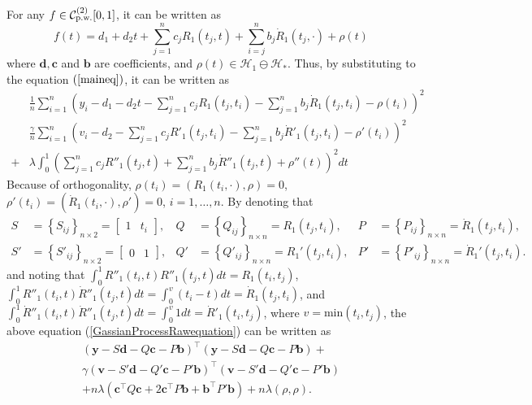 For any $f\in\mathcal{C}_{\mbox{\scriptsize p.w.}}^{(2)}[0,1]$, it can be written as 
\begin{equation}\label{GaussianProcessFunctionF}
f(t)=d_1+d_2t+\sum_{j=1}^{n}c_jR_1(t_j,t)+\sum_{i=j}^{n}b_j\dot{R}_1(t_j,\cdot) +\rho(t)
\end{equation}
where $\mathbf{d},\mathbf{c}$ and $\mathbf{b}$ are coefficients, and $\rho(t) \in \mathcal{H}_1 \ominus \mathcal{H}_*$. Thus, by substituting to the equation $(\ref{maineq})$, it can be written as 
\begin{equation}\label{GassianProcessRawequation}
\begin{split}
&\frac{1}{n}\sum_{i=1}^n \left( y_i - d_1-d_2t-\sum_{j=1}^{n}c_jR_1(t_j,t_i)-\sum_{j=1}^{n}b_j\dot{R}_1(t_j,t_i)-\rho(t_i) \right) ^2\\
&\frac{\gamma}{n}\sum_{i=1}^n \left( v_i - d_2-\sum_{j=1}^{n}c_jR'_1(t_j,t_i)-\sum_{j=1}^{n}b_j\dot{R}'_1(t_j,t_i)-\rho'(t_i) \right) ^2\\
+&\lambda \int_0^1 \left( \sum_{j=1}^{n}c_jR''_1(t_j,t)+\sum_{j=1}^{n}b_j\dot{R}''_1(t_j,t)+\rho''(t)\right)^2dt
\end{split}
\end{equation}
Because of orthogonality, $\rho(t_i) = \left(R_1(t_i,\cdot),\rho\right)=0$, $\rho'(t_i) = \left(\dot{R}_1(t_i,\cdot),\rho'\right)=0$, $i=1,\ldots,n$. By denoting that 
\begin{align*}
S&=\left\lbrace S_{ij} \right\rbrace_{n\times 2}=\begin{bmatrix}1 & t_i \end{bmatrix} ,& Q&=\left\lbrace Q_{ij} \right\rbrace_{n\times n}= R_1(t_j,t_i), & P&=\left\lbrace P_{ij} \right\rbrace_{n\times n}= \dot{R}_1(t_j,t_i), \\
S'&=\left\lbrace S'_{ij} \right\rbrace_{n\times 2}=\begin{bmatrix} 0 & 1 \end{bmatrix} ,& Q'&=\left\lbrace Q'_{ij} \right\rbrace_{n\times n}= R_1'(t_j,t_i), & P'&=\left\lbrace P'_{ij} \right\rbrace_{n\times n}= \dot{R}_1'(t_j,t_i). 
\end{align*}
and noting that $\int_0^1R''_1(t_i,t)R''_1(t_j,t)dt=R_1(t_i,t_j)$, $\int_0^1R''_1(t_i,t)\dot{R}''_1(t_j,t)dt=\int_0^{v}(t_i-t)dt=\dot{R}_1(t_j,t_i)$, and $\int_0^1\dot{R}''_1(t_i,t)\dot{R}''_1(t_j,t)dt=\int_0^{v}1dt=\dot{R}'_1(t_i,t_j)$, where $v=\mbox{min}(t_i,t_j)$, the above equation (\ref{GassianProcessRawequation}) can be written as 
\begin{equation}\label{matriteq}
\begin{split}
\left(\mathbf{y}-S\mathbf{d}-Q\mathbf{c}-P\mathbf{b}\right)^\top \left(\mathbf{y}-S\mathbf{d}-Q\mathbf{c}-P\mathbf{b}\right)+\\
\gamma\left(\mathbf{v}-S'\mathbf{d}-Q'\mathbf{c}-P'\mathbf{b}\right)^\top \left(\mathbf{v}-S'\mathbf{d}-Q'\mathbf{c}-P'\mathbf{b}\right)\\
+n\lambda \left(\mathbf{c}^\top Q\mathbf{c} + 2\mathbf{c}^\top P\mathbf{b}+ \mathbf{b}^\top P'\mathbf{b}\right)+n\lambda\left(\rho,\rho\right).
\end{split}
\end{equation}
